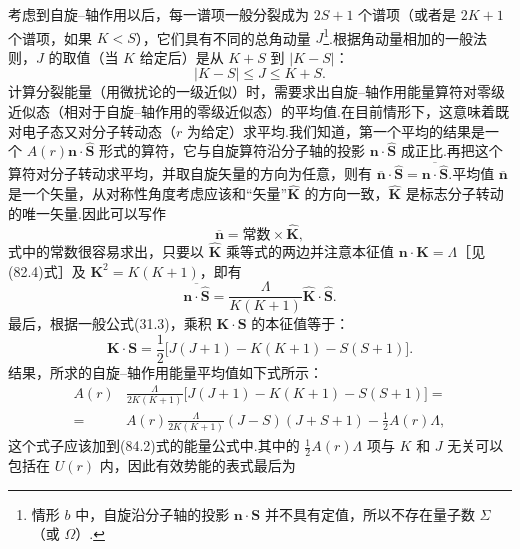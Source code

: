 考虑到自旋–轴作用以后，每一谱项一般分裂成为 $2S+1$ 个谱项（或者是 $2K+1$ 个谱项，如果 $K<S$），它们具有不同的总角动量 $J$\footnote{情形 $b$ 中，自旋沿分子轴的投影 $\boldsymbol{n}\cdot\boldsymbol{S}$ 并不具有定值，所以不存在量子数 $\Sigma$（或 $\Omega$）.}.根据角动量相加的一般法则，$J$ 的取值（当 $K$ 给定后）是从 $K+S$ 到 $|K-S|$：
\begin{equation}
  |K-S|\leqslant J\leqslant K+S.
\end{equation}
计算分裂能量（用微扰论的一级近似）时，需要求出自旋–轴作用能量算符对零级近似态（相对于自旋–轴作用的零级近似态）的平均值.在目前情形下，这意味着既对电子态又对分子转动态（$r$ 为给定）求平均.我们知道，第一个平均的结果是一个 $A(r)\boldsymbol{n}\cdot\hat{\boldsymbol{S}}$ 形式的算符，它与自旋算符沿分子轴的投影 $\boldsymbol{n}\cdot\hat{\boldsymbol{S}}$ 成正比.再把这个算符对分子转动求平均，并取自旋矢量的方向为任意，则有 $\overline{\boldsymbol{n}}\cdot\hat{\boldsymbol{S}}=\overline{\boldsymbol{n}\cdot\hat{\boldsymbol{S}}}$.平均值 $\overline{\boldsymbol{n}}$ 是一个矢量，从对称性角度考虑应该和“矢量”$\hat{\boldsymbol{K}}$ 的方向一致，$\hat{\boldsymbol{K}}$ 是标志分子转动的唯一矢量.因此可以写作
\begin{equation*}
  \overline{\boldsymbol{n}}=\text{常数}\times\hat{\boldsymbol{K}},
\end{equation*}
式中的常数很容易求出，只要以 $\hat{\boldsymbol{K}}$ 乘等式的两边并注意本征值 $\boldsymbol{n}\cdot\boldsymbol{K}=\Lambda$［见(82.4)式］及 $\boldsymbol{K}^2=K(K+1)$，即有
\begin{equation*}
  \overline{\boldsymbol{n}\cdot\hat{\boldsymbol{S}}}
  =\frac{\Lambda}{K(K+1)}\hat{\boldsymbol{K}}\cdot\hat{\boldsymbol{S}}.
\end{equation*}
最后，根据一般公式(31.3)，乘积 $\boldsymbol{K}\cdot\boldsymbol{S}$ 的本征值等于：
\begin{equation}
  \boldsymbol{K}\cdot\boldsymbol{S}
  =\frac{1}{2}\bigl[J(J+1)-K(K+1)-S(S+1)\bigr].
\end{equation}
结果，所求的自旋–轴作用能量平均值如下式所示：
\begin{equation*}
\begin{aligned}
  A(r)&\frac{\Lambda}{2K(K+1)}
  \bigl[J(J+1)-K(K+1)-S(S+1)\bigr]=\\
  ={}&A(r)\frac{\Lambda}{2K(K+1)}(J-S)(J+S+1)-\frac{1}{2}A(r)\Lambda,
\end{aligned}
\end{equation*}
这个式子应该加到(84.2)式的能量公式中.其中的 $\frac{1}{2}A(r)\Lambda$ 项与 $K$ 和 $J$ 无关可以包括在 $U(r)$ 内，因此有效势能的表式最后为
